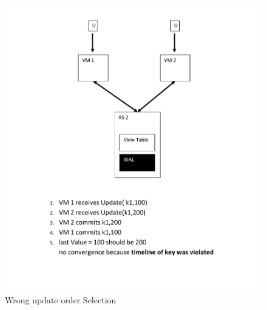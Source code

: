\begin{figure}[h!]
  \centering
    \includegraphics[scale=0.8]{figures/CO_WrongUpdateOrderSelection}
     \caption{Wrong update order Selection}
    \label{fig:co_wrongupdateorderselection}
\end{figure}
\newpage

